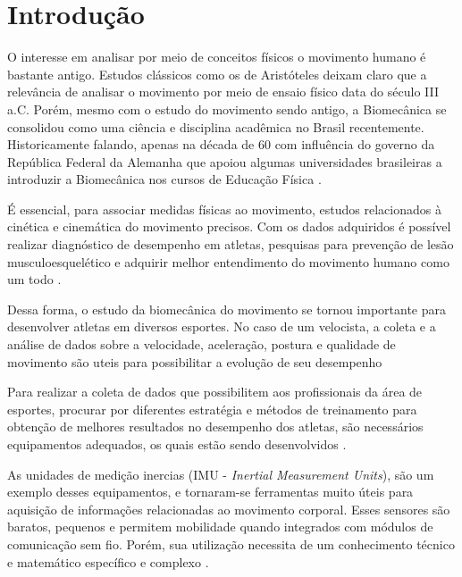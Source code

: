 
\chapter[Introdução]{Introdução}

O interesse em analisar por meio de conceitos físicos o movimento humano é bastante antigo. Estudos clássicos como os de Aristóteles deixam claro que a relevância de analisar o movimento por meio de ensaio físico data do século III a.C. Porém, mesmo com o estudo do movimento sendo antigo, a Biomecânica se consolidou como uma ciência e disciplina acadêmica no Brasil recentemente. Historicamente falando, apenas na década de 60 com influência do governo da República Federal da Alemanha que apoiou algumas universidades brasileiras a introduzir a Biomecânica nos cursos de Educação Física \cite{Acquesta2008}.

É essencial, para associar medidas físicas ao movimento,  estudos relacionados à cinética e cinemática do movimento precisos. Com os dados adquiridos é possível realizar diagnóstico de desempenho em atletas, pesquisas para prevenção de lesão musculoesquelético e adquirir melhor entendimento do movimento humano como um todo \cite{mcginnis2013}.

Dessa forma, o estudo da biomecânica do movimento se tornou importante para desenvolver atletas em diversos esportes. No caso de um velocista, a coleta e a análise de dados sobre a velocidade, aceleração, postura e qualidade de movimento são uteis para possibilitar a evolução de seu desempenho \cite{okazaki2012}

Para realizar a coleta de dados que possibilitem aos profissionais da área de esportes, procurar por diferentes estratégia e métodos de treinamento para obtenção de melhores resultados no desempenho dos atletas, são necessários equipamentos adequados, os quais estão sendo desenvolvidos \cite{okazaki2012}.  


As unidades de medição inercias (IMU - \textit{Inertial Measurement Units}), são um exemplo desses equipamentos, e tornaram-se ferramentas muito úteis para aquisição de informações relacionadas ao movimento corporal. Esses sensores são baratos, pequenos e permitem mobilidade quando integrados com módulos de comunicação sem fio. Porém, sua utilização necessita de um conhecimento técnico e matemático específico e complexo \cite{ober2015}.

